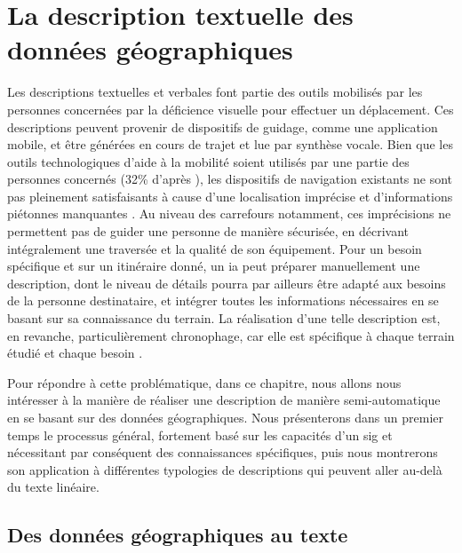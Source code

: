 \chapter{La description textuelle des données géographiques}

\label{chap:description}



Les descriptions textuelles et verbales font partie des outils mobilisés par les personnes concernées par la déficience visuelle pour effectuer un déplacement. Ces descriptions peuvent provenir de dispositifs de guidage, comme une application mobile, et être générées en cours de trajet et lue par synthèse vocale. Bien que les outils technologiques d'aide à la mobilité soient utilisés par une partie des personnes concernés (32\% d’après \citet{homere_2023}), les dispositifs de navigation existants ne sont pas pleinement satisfaisants à cause d’une localisation imprécise et d’informations piétonnes manquantes \citep{Guth2019}. Au niveau des carrefours notamment, ces imprécisions ne permettent pas de guider une personne de manière sécurisée, en décrivant intégralement une traversée et la qualité de son équipement. Pour un besoin spécifique et sur un itinéraire donné, un \gls{ia} peut préparer manuellement une description, dont le niveau de détails pourra par ailleurs être adapté aux besoins de la personne destinataire, et intégrer toutes les informations nécessaires en se basant sur sa connaissance du terrain. La réalisation d’une telle description est, en revanche, particulièrement chronophage, car elle est spécifique à chaque terrain étudié et chaque besoin \citep{kern2016}.

\newpar{}

Pour répondre à cette problématique, dans ce chapitre, nous allons nous intéresser à la manière de réaliser une description de manière semi-automatique en se basant sur des données géographiques. Nous présenterons dans un premier temps le processus général, fortement basé sur les capacités d’un \gls{sig} et nécessitant par conséquent des connaissances spécifiques, puis nous montrerons son application à différentes typologies de descriptions qui peuvent aller au-delà du texte linéaire.

\section{Des données géographiques au texte}

